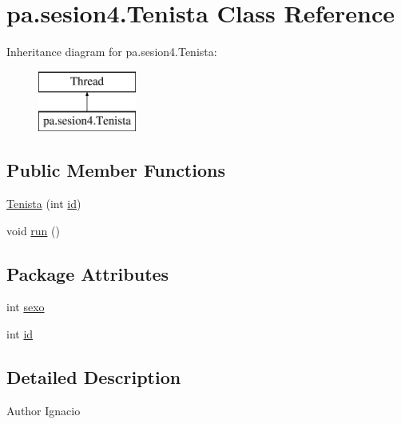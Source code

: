 \hypertarget{classpa_1_1sesion4_1_1_tenista}{}\section{pa.\+sesion4.\+Tenista Class Reference}
\label{classpa_1_1sesion4_1_1_tenista}
Inheritance diagram for pa.\+sesion4.\+Tenista\+:\begin{figure}[H]
\begin{center}
\leavevmode
\includegraphics[height=2.000000cm]{classpa_1_1sesion4_1_1_tenista}
\end{center}
\end{figure}
\subsection*{Public Member Functions}
\begin{DoxyCompactItemize}
\item 
\mbox{\hyperlink{classpa_1_1sesion4_1_1_tenista_ade44ec1b8a3bd722846ed25c6f1262c7}{Tenista}} (int \mbox{\hyperlink{classpa_1_1sesion4_1_1_tenista_aa1cefb7bce1731c6a8cb44a98759c9af}{id}})
\item 
void \mbox{\hyperlink{classpa_1_1sesion4_1_1_tenista_aaa08c6a87cb2c514484b7fd1ed829a13}{run}} ()
\end{DoxyCompactItemize}
\subsection*{Package Attributes}
\begin{DoxyCompactItemize}
\item 
int \mbox{\hyperlink{classpa_1_1sesion4_1_1_tenista_aabbd7677d3913d001386bb318ec9f1d1}{sexo}}
\item 
int \mbox{\hyperlink{classpa_1_1sesion4_1_1_tenista_aa1cefb7bce1731c6a8cb44a98759c9af}{id}}
\end{DoxyCompactItemize}


\subsection{Detailed Description}
\begin{DoxyAuthor}{Author}
Ignacio 
\end{DoxyAuthor}


